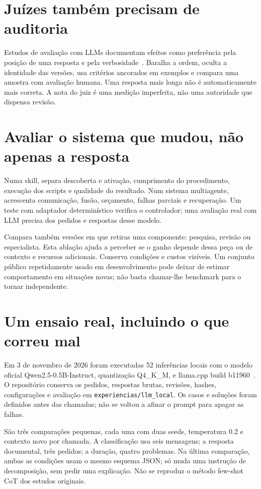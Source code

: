 \section{Juízes também precisam de auditoria}
Estudos de avaliação com LLMs documentam efeitos como preferência pela posição de uma resposta e pela verbosidade~\citep{zheng2023}. Baralha a ordem, oculta a identidade das versões, usa critérios ancorados em exemplos e compara uma amostra com avaliação humana. Uma resposta mais longa não é automaticamente mais correta. A nota do juiz é uma medição imperfeita, não uma autoridade que dispensa revisão.

\section{Avaliar o sistema que mudou, não apenas a resposta}
Numa skill, separa descoberta e ativação, cumprimento do procedimento, execução dos scripts e qualidade do resultado. Num sistema multiagente, acrescenta comunicação, fusão, orçamento, falhas parciais e recuperação. Um teste com adaptador determinístico verifica o controlador; uma avaliação real com LLM precisa dos pedidos e respostas desse modelo.

Compara também versões em que retiras uma componente: pesquisa, revisão ou especialista. Esta ablação ajuda a perceber se o ganho depende dessa peça ou de contexto e recursos adicionais. Conserva condições e custos visíveis. Um conjunto público repetidamente usado em desenvolvimento pode deixar de estimar comportamento em situações novas; não basta chamar-lhe benchmark para o tornar independente.

\section{Um ensaio real, incluindo o que correu mal}
\label{sec:ensaio-real}
Em 3 de novembro de 2026 foram executadas 52 inferências locais com o modelo oficial Qwen2.5-0.5B-Instruct, quantização Q4\_K\_M, e llama.cpp build b11960~\citep{qwengguf,llamacpp}. O repositório conserva os pedidos, respostas brutas, revisões, hashes, configurações e avaliação em \texttt{experiencias/llm\_local}. Os casos e soluções foram definidos antes das chamadas; não se voltou a afinar o prompt para apagar as falhas.

São três comparações pequenas, cada uma com duas seeds, temperatura 0.2 e contexto novo por chamada. A classificação usa seis mensagens; a resposta documental, três pedidos; a duração, quatro problemas. Na última comparação, ambas as condições usam o mesmo esquema JSON; só muda uma instrução de decomposição, sem pedir uma explicação. Não se reproduz o método few-shot CoT dos estudos originais.

